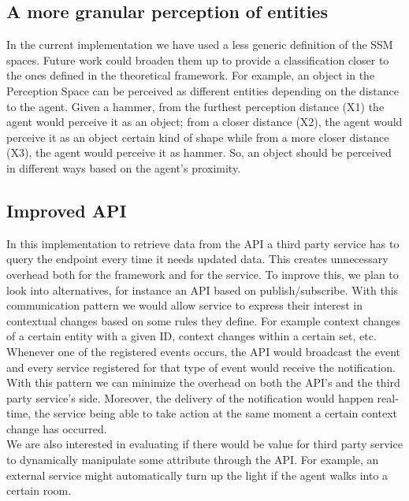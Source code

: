 \subsection{A more granular perception of entities}
In the current implementation we have used a less generic definition of the SSM spaces. Future work could broaden them up to provide a classification closer to the ones defined in the theoretical framework. For example, an object in the Perception Space can be perceived as different entities depending on the distance to the agent. Given a hammer, from the furthest perception distance (X1) the agent would perceive it as an object; from a closer distance (X2), the agent would perceive it as an object certain kind of shape while from a more closer distance (X3), the agent would perceive it as hammer. So, an object should be perceived in different ways based on the agent's proximity.

\subsection{Improved API}
In this implementation to retrieve data from the API a third party service has to query the endpoint every time it needs updated data. This creates unnecessary overhead both for the framework and for the service. To improve this, we plan to look into alternatives, for instance an API based on publish/subscribe. With this communication pattern we would allow service to express their interest in contextual changes based on some rules they define. For example context changes of a certain entity with a given ID, context changes within a certain set, etc. Whenever one of the registered events occurs, the API would broadcast the event and every service registered for that type of event would receive the notification. With this pattern we can minimize the overhead on both the API's and the third party service's side. Moreover, the delivery of the notification would happen real-time, the service being able to take action at the same moment a certain context change has occurred.\\

We are also interested in evaluating if there would be value for third party service to dynamically manipulate some attribute through the API. For example, an external service might automatically turn up the light if the agent walks into a certain room.

